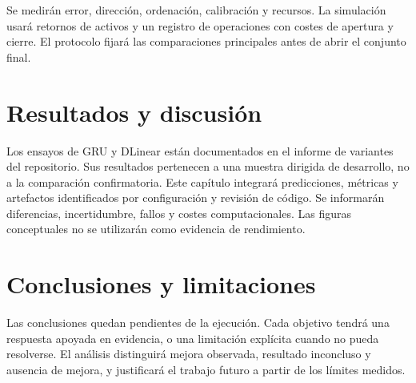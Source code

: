 \documentclass[11pt,a4paper]{report}
\begin{document}
Se medirán error, dirección, ordenación, calibración y recursos. La simulación usará
retornos de activos y un registro de operaciones con costes de apertura y cierre.
El protocolo fijará las comparaciones principales antes de abrir el conjunto final.

\chapter{Resultados y discusión}
Los ensayos de GRU y DLinear están documentados en el informe de variantes del
repositorio. Sus resultados pertenecen a una muestra dirigida de desarrollo,
no a la comparación confirmatoria. Este capítulo integrará predicciones,
métricas y artefactos identificados por configuración y revisión de código.
Se informarán diferencias, incertidumbre, fallos y costes computacionales.
Las figuras conceptuales no se utilizarán como evidencia de rendimiento.

\chapter{Conclusiones y limitaciones}
Las conclusiones quedan pendientes de la ejecución. Cada objetivo tendrá una
respuesta apoyada en evidencia, o una limitación explícita cuando no pueda
resolverse. El análisis distinguirá mejora observada, resultado inconcluso y
ausencia de mejora, y justificará el trabajo futuro a partir de los límites medidos.

\printbibliography
\end{document}
